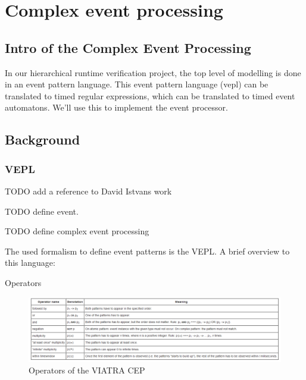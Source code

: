 \chapter{Complex event processing}
	\label{chap:cep}
	\section{Intro of the Complex Event Processing}
		In our hierarchical runtime verification project, the top level of modelling is done in an event pattern language.
		This event pattern language (vepl) can be translated to timed regular expressions, which can be translated to 
		timed event automatons. We'll use this to implement the event processor. 
	\section{Background}
		\subsection{VEPL}
			TODO add a reference to David Istvans work
			
			TODO define event.
			
			TODO define complex event processing
			
			The used formalism to define event patterns is the VEPL. A brief overview to this language:
			
			
			Operators

			\begin{figure}[h]
			\centering
			\includegraphics[width=0.5\linewidth]{include/figures/chapter_5/viatracepoperators}
			\caption{Operators of the VIATRA CEP}
			\label{fig:cep:viatracepoperators}
			\end{figure}			
			
			
